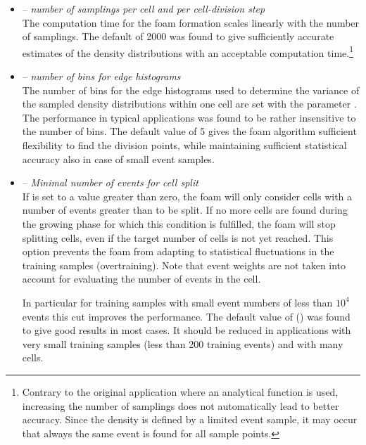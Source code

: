 \begin{itemize}
\item {} -- {\em number of samplings per cell and per cell-division step }\\
The computation time for the foam formation scales
linearly with the number of samplings. The default of 2000 was found
to give sufficiently accurate estimates of the density distributions
with an acceptable computation time.\footnote
{
   Contrary to the original application where an analytical function is 
   used, increasing the number of samplings does not automatically lead to 
   better accuracy. Since the density is defined by a limited event sample, 
   it may occur that always the same event is found for all sample points.
}

\item {} -- {\em number of bins for edge histograms }\\
The number of bins for the edge histograms used to determine the
variance of the sampled density distributions within one cell are set
with the parameter . The performance in typical
applications was found to be rather insensitive to the number of bins.
The default value of 5 gives the foam algorithm sufficient flexibility
to find the division points, while maintaining sufficient statistical
accuracy also in case of small event samples.

\item {} -- {\em Minimal number of events for cell split}\\
If  is set to a value greater than zero, the foam will only consider
cells with a number of events greater than  to be split.
If no more cells are found during the growing phase for which this
condition is fulfilled, the foam will stop splitting cells, even if
the target number of cells is not yet reached. 
This option prevents
the foam from adapting to statistical fluctuations in the training
samples (overtraining). 
Note that event 
weights are not taken into account for evaluating the number of events 
in the cell. 

In particular for training samples with small event numbers of less
than $10^4$ events this cut improves the performance. The default
value of () was found to give good results in most
cases.  It should be reduced in applications
with very small training samples (less than 200 training events) and
with many cells. 


\end{itemize}
